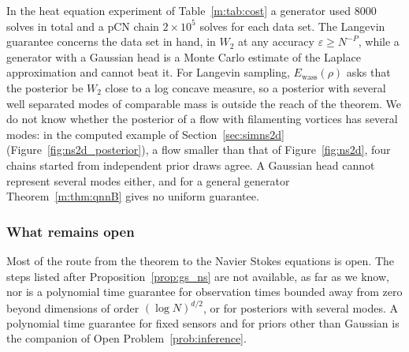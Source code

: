 In the heat equation experiment of Table~\ref{m:tab:cost} a generator used $8000$ solves in total and a pCN chain $2\times10^5$ solves for each data set. The Langevin guarantee concerns the data set in hand, in $W_2$ at any accuracy $\varepsilon\ge N^{-P}$, while a generator with a Gaussian head is a Monte Carlo estimate of the Laplace approximation and cannot beat it. For Langevin sampling, $E_{\mathrm{wass}}(\rho)$ asks that the posterior be $W_2$ close to a log concave measure, so a posterior with several well separated modes of comparable mass is outside the reach of the theorem. We do not know whether the posterior of a flow with filamenting vortices has several modes: in the computed example of Section~\ref{sec:simns2d} (Figure~\ref{fig:ns2d_posterior}), a flow smaller than that of Figure~\ref{fig:ns2d}, four chains started from independent prior draws agree. A Gaussian head cannot represent several modes either, and for a general generator Theorem~\ref{m:thm:qnnB} gives no uniform guarantee.

\subsubsection{What remains open} Most of the route from the theorem to the Navier Stokes equations is open. The steps listed after Proposition~\ref{prop:gs_ns} are not available, as far as we know, nor is a polynomial time guarantee for observation times bounded away from zero beyond dimensions of order $(\log N)^{d/2}$, or for posteriors with several modes. A polynomial time guarantee for fixed sensors and for priors other than Gaussian is the companion of Open Problem~\ref{prob:inference}.
